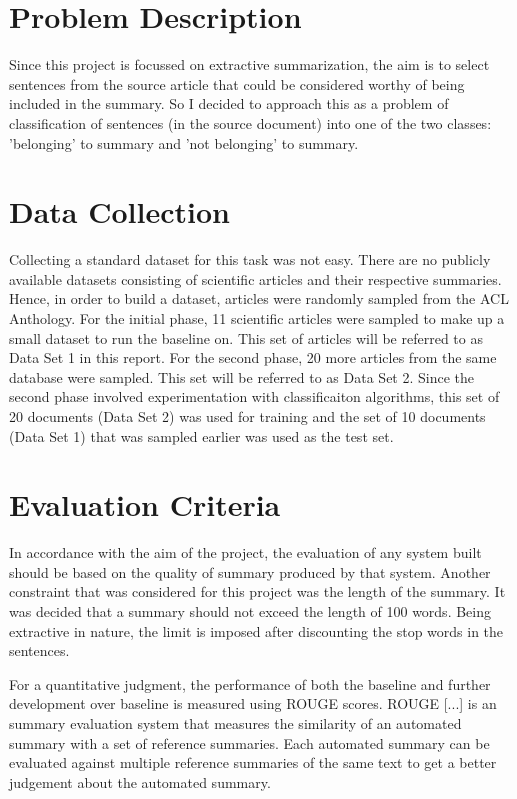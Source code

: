 \section{Problem Description}
Since this project is focussed on extractive summarization, the aim is to select sentences from the source article that could be considered worthy of being included in the summary.
So I decided to approach this as a problem of classification of sentences (in the source document) into one of the two classes: 'belonging' to summary and 'not belonging' to summary.

\section{Data Collection}
Collecting a standard dataset for this task was not easy.
There are no publicly available datasets consisting of scientific articles and their respective summaries.
Hence, in order to build a dataset, articles were randomly sampled from the ACL Anthology.
For the initial phase, 11 scientific articles were sampled to make up a small dataset to run the baseline on.
This set of articles will be referred to as Data Set 1 in this report.
For the second phase, 20 more articles from the same database were sampled.
This set will be referred to as Data Set 2.
Since the second phase involved experimentation with classificaiton algorithms, this set of 20 documents (Data Set 2) was used for training and the set of 10 documents (Data Set 1) that was sampled earlier was used as the test set.

\section{Evaluation Criteria}
In accordance with the aim of the project, the evaluation of any system built should be based on the quality of summary produced by that system.
Another constraint that was considered for this project was the length of the summary.
It was decided that a summary should not exceed the length of 100 words.
Being extractive in nature, the limit is imposed after discounting the stop words in the sentences.

For a quantitative judgment, the performance of both the baseline and further development over baseline is measured using ROUGE scores.
ROUGE [...] is an summary evaluation system that measures the similarity of an automated summary with a set of reference summaries.
Each automated summary can be evaluated against multiple reference summaries of the same text to get a better judgement about the automated summary.

